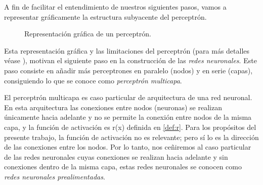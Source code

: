 \documentclass[12pt, a4paper, twoside]{book}
\numberwithin{equation}{section}
\theoremstyle{definition}
\theoremstyle{remark}
\theoremstyle{plain}
\begin{document}
	A fin de facilitar el entendimiento de nuestros siguientes pasos, 
	vamos a representar gráficamente la estructura subyacente del 
	perceptrón.
	\begin{figure}[H]
		\centering
		\caption{Representación gráfica de un perceptrón.}
		\label{fig:perceptron}
	\end{figure}

	Esta representación gráfica y las limitaciones del perceptrón (para 
	más detalles véase \cite{Perceptron-Convergencia}), motivan el 
	siguiente paso en la 
	construcción de las \emph{redes neuronales}. Este paso consiste en 
	añadir más perceptrones en paralelo (nodos) y en serie (capas), 
	consiguiendo lo que se conoce como \emph{perceptrón multicapa}.

	El perceptrón multicapa es caso particular de arquitectura de una red 
	neuronal. En esta arquitectura las conexiones entre nodos (neuronas) 
	se realizan únicamente hacia adelante y no se permite la conexión 
	entre nodos de la misma capa, y la función de activación es 
	r(x) definida en \ref{def:r}. Para los propósitos del presente 
	trabajo, la función de activación no es relevante; pero sí lo es la 
	dirección de las conexiones entre los nodos. Por lo tanto, nos 
	ceñiremos al caso particular de las redes neuronales cuyas conexiones
	se realizan hacia adelante y sin conexiones dentro de la misma capa, 
	estas redes neuronales se conocen como \emph{redes neuronales 
	prealimentadas}. 
	
\end{document}
